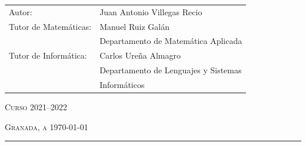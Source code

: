 \begin{titlepage}
	\begin{table}[h!]
			\begin{tabular}{p{}p{}}
				{\LARGE Autor:} & {\LARGE Juan Antonio Villegas Recio} \\[1cm]
				{\Large Tutor de Matemáticas:}    & {\Large Manuel Ruiz Galán} \\
				& {\Large Departamento de Matemática Aplicada} \\ [0.5cm]
				{\Large Tutor de Informática:}      & {\Large Carlos Ureña Almagro} \\
				& {\Large Departamento de Lenguajes y Sistemas} \\
				& {\Large Informáticos}
			\end{tabular}
	\end{table}
	
	\vfill
	{\Large\centering \textsc{Curso 2021--2022} \par}
	{\Large\centering \textsc{Granada, a \today} \par}
	\vspace{1cm}

	\hrule
	\vspace{0.3cm}
	
	
	
\end{titlepage}